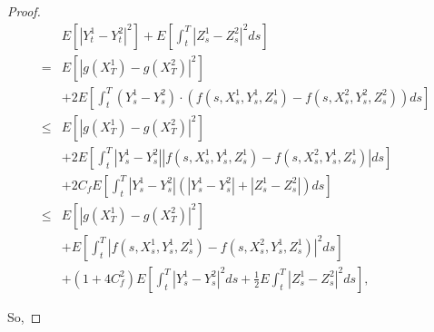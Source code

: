 \begin{proof}
\begin{equation}
	\begin{aligned}
		& E\left[\left|Y_t^1-Y_t^2\right|^2\right]+E\left[\int_t^T\left|Z_s^1-Z_s^2\right|^2 d s\right] \\
		= & E\left[\left|g\left(X_T^1\right)-g\left(X_T^2\right)\right|^2\right] \\
		& +2 E\left[\int_t^T\left(Y_s^1-Y_s^2\right) \cdot\left(f\left(s, X_s^1, Y_s^1, Z_s^1\right)-f\left(s, X_s^2, Y_s^2, Z_s^2\right)\right) d s\right] \\
		\leq & E\left[\left|g\left(X_T^1\right)-g\left(X_T^2\right)\right|^2\right] \\
		& +2 E\left[\int_t^T\left|Y_s^1-Y_s^2\right|\left|f\left(s, X_s^1, Y_s^1, Z_s^1\right)-f\left(s, X_s^2, Y_s^1, Z_s^1\right)\right| d s\right] \\
		& +2 C_f E\left[\int_t^T\left|Y_s^1-Y_s^2\right|\left(\left|Y_s^1-Y_s^2\right|+\left|Z_s^1-Z_s^2\right|\right) d s\right] \\
		\leq & E\left[\left|g\left(X_T^1\right)-g\left(X_T^2\right)\right|^2\right] \\
		& +E\left[\int_t^T\left|f\left(s, X_s^1, Y_s^1, Z_s^1\right)-f\left(s, X_s^2, Y_s^1, Z_s^1\right)\right|^2 d s\right] \\
		& +\left(1+4 C_f^2\right) E\left[\int_t^T\left|Y_s^1-Y_s^2\right|^2 d s+\frac{1}{2} E \int_t^T\left|Z_s^1-Z_s^2\right|^2 d s\right],
	\end{aligned}
\end{equation}

So,


\end{proof}
